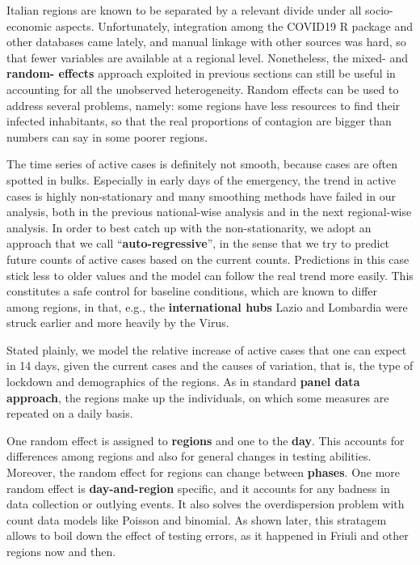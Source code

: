 \documentclass[
  6pt,
]{article}
\begin{document}
Italian regions are known to be separated by a relevant divide under all
socio-economic aspects. Unfortunately, integration among the COVID19 R
package and other databases came lately, and manual linkage with other
sources was hard, so that fewer variables are available at a regional
level. Nonetheless, the mixed- and \textbf{random- effects} approach
exploited in previous sections can still be useful in accounting for all
the unobserved heterogeneity. Random effects can be used to address
several problems, namely: some regions have less resources to find their
infected inhabitants, so that the real proportions of contagion are
bigger than numbers can say in some poorer regions.

The time series of active cases is definitely not smooth, because cases
are often spotted in bulks. Especially in early days of the emergency,
the trend in active cases is highly non-stationary and many smoothing
methods have failed in our analysis, both in the previous national-wise
analysis and in the next regional-wise analysis. In order to best catch
up with the non-stationarity, we adopt an approach that we call
``\textbf{auto-regressive}'', in the sense that we try to predict future
counts of active cases based on the current counts. Predictions in this
case stick less to older values and the model can follow the real trend
more easily. This constitutes a safe control for baseline conditions,
which are known to differ among regions, in that, e.g., the
\textbf{international hubs} Lazio and Lombardia were struck earlier and
more heavily by the Virus.

Stated plainly, we model the relative increase of active cases that one
can expect in 14 days, given the current cases and the causes of
variation, that is, the type of lockdown and demographics of the
regions. As in standard \textbf{panel data approach}, the regions make
up the individuals, on which some measures are repeated on a daily
basis.

One random effect is assigned to \textbf{regions} and one to the
\textbf{day}. This accounts for differences among regions and also for
general changes in testing abilities. Moreover, the random effect for
regions can change between \textbf{phases}. One more random effect is
\textbf{day-and-region} specific, and it accounts for any badness in
data collection or outlying events. It also solves the overdispersion
problem with count data models like Poisson and binomial. As shown
later, this stratagem allows to boil down the effect of testing errors,
as it happened in Friuli and other regions now and then.
\end{document}
